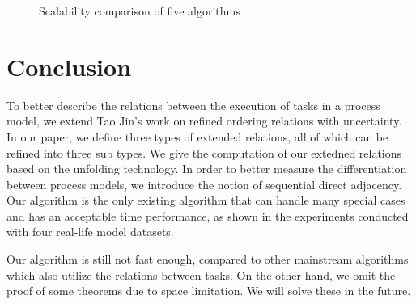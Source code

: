 \documentclass[dvips,...]{llncs}
\begin{document}
\begin{figure}[htbp]
\centering
{}
\caption{Scalability comparison of five algorithms\label{fig:scalability}}
\end{figure}


\section{Conclusion}\label{sec:conclusion}
To better describe the relations between the execution of tasks in a process model, we extend Tao Jin's work on refined ordering relations with uncertainty. In our paper, we define three types of extended relations, all of which can be refined into three sub types. We give the computation of our extedned relations based on the unfolding technology. In order to better measure the differentiation between process models, we introduce the notion of sequential direct adjacency. Our algorithm is the only existing algorithm that can handle many special cases and has an acceptable time performance, as shown in the experiments conducted with four real-life model datasets.

Our algorithm is still not fast enough, compared to other mainstream algorithms which also utilize the relations between tasks. On the other hand, we omit the proof of some theorems due to space limitation. We will solve these in the future.



\end{document}
